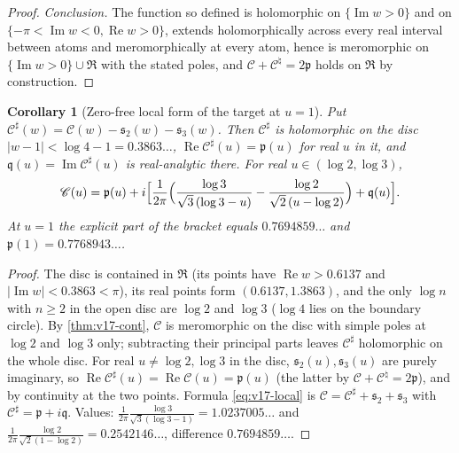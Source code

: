 \documentclass[11pt,a4paper]{article}
\numberwithin{equation}{section}
\newtheorem{corollary}[theorem]{Corollary}
\theoremstyle{definition}
\theoremstyle{remark}
\begin{document}
\begin{proof}
\emph{Conclusion.} The function so defined is holomorphic on $\{\operatorname{Im}w>0\}$ and on $\{-\pi<\operatorname{Im}w<0,\operatorname{Re}w>0\}$, extends holomorphically across every real interval between atoms and meromorphically at every atom, hence is meromorphic on $\{\operatorname{Im}w>0\}\cup\mathfrak R$ with the stated poles, and $\mathscr C+\mathscr C^\natural=2\mathfrak p$ holds on $\mathfrak R$ by construction.
\end{proof}

\begin{corollary}[Zero-free local form of the target at $u=1$]\label{cor:v17-local}
Put $\mathscr C^\sharp(w)=\mathscr C(w)-\mathfrak s_2(w)-\mathfrak s_3(w)$. Then $\mathscr C^\sharp$ is holomorphic on the disc $|w-1|<\log4-1=0.3863\ldots$, $\operatorname{Re}\mathscr C^\sharp(u)=\mathfrak p(u)$ for real $u$ in it, and $\mathfrak q(u)=\operatorname{Im}\mathscr C^\sharp(u)$ is real-analytic there. For real $u\in(\log2,\log3)$,
\begin{equation}\label{eq:v17-local}
\mathscr C(u)=\mathfrak p(u)+i\Bigl[\frac1{2\pi}\Bigl(\frac{\log3}{\sqrt3\,(\log3-u)}-\frac{\log2}{\sqrt2\,(u-\log2)}\Bigr)+\mathfrak q(u)\Bigr].
\end{equation}
At $u=1$ the explicit part of the bracket equals $0.7694859\ldots$ and $\mathfrak p(1)=0.7768943\ldots$.
\end{corollary}
\begin{proof}
The disc is contained in $\mathfrak R$ (its points have $\operatorname{Re}w>0.6137$ and $|\operatorname{Im}w|<0.3863<\pi$), its real points form $(0.6137,1.3863)$, and the only $\log n$ with $n\ge2$ in the open disc are $\log2$ and $\log3$ ($\log4$ lies on the boundary circle). By \cref{thm:v17-cont}, $\mathscr C$ is meromorphic on the disc with simple poles at $\log2$ and $\log3$ only; subtracting their principal parts leaves $\mathscr C^\sharp$ holomorphic on the whole disc. For real $u\ne\log2,\log3$ in the disc, $\mathfrak s_2(u),\mathfrak s_3(u)$ are purely imaginary, so $\operatorname{Re}\mathscr C^\sharp(u)=\operatorname{Re}\mathscr C(u)=\mathfrak p(u)$ (the latter by $\mathscr C+\mathscr C^\natural=2\mathfrak p$), and by continuity at the two points. Formula \eqref{eq:v17-local} is $\mathscr C=\mathscr C^\sharp+\mathfrak s_2+\mathfrak s_3$ with $\mathscr C^\sharp=\mathfrak p+i\mathfrak q$. Values: $\frac1{2\pi}\frac{\log3}{\sqrt3(\log3-1)}=1.0237005\ldots$ and $\frac1{2\pi}\frac{\log2}{\sqrt2(1-\log2)}=0.2542146\ldots$, difference $0.7694859\ldots$.
\end{proof}
\end{document}
